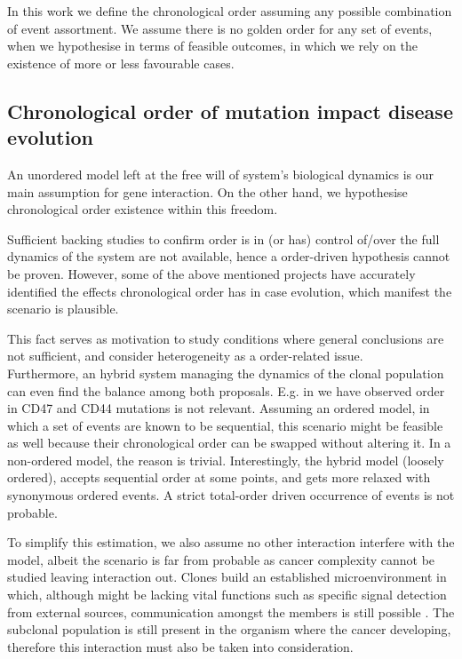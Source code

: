 In this work we define the chronological order assuming any possible combination of event assortment. We assume there is no golden order for any set of events, when we hypothesise in terms of feasible outcomes, in which we rely on the existence of more or less favourable cases.
\\
\subsection{Chronological order of mutation impact disease evolution}

An unordered model left at the free will of system's biological dynamics is our main assumption for gene interaction. On the other hand, we hypothesise chronological order existence within this freedom.

Sufficient backing studies to confirm order is in (or has) control of/over the full dynamics of the system are not available, hence a order-driven hypothesis cannot be proven. However, some of the above mentioned projects have accurately identified the effects chronological order has in case evolution, which manifest the scenario is plausible. 

This fact serves as motivation to study conditions where general conclusions are not sufficient, and consider heterogeneity as a order-related issue.
\\

Furthermore, an hybrid system managing the dynamics of the clonal population can even find the balance among both proposals. E.g. in \cite{Ascolani2019ModelingMatter} we have observed order in CD47 and CD44 mutations is not relevant. Assuming an ordered model, in which a set of events are known to be sequential, this scenario might be feasible as well because their chronological order can be swapped without altering it. In a non-ordered model, the reason is trivial. Interestingly, the hybrid model (loosely ordered), accepts sequential order at some points, and gets more relaxed with synonymous ordered events. A strict total-order driven occurrence of events is not probable.

To simplify this estimation, we also assume no other interaction interfere with the model, albeit the scenario is far from probable as cancer complexity cannot be studied leaving interaction out. Clones build an established microenvironment in which, although might be lacking vital functions such as specific signal detection from external sources, communication amongst the members is still possible \cite{Chiodoni2019Correction10.1186/s13046-019-1122-2}. The subclonal population is still present in the organism where the cancer developing, therefore this interaction must also be taken into consideration.

